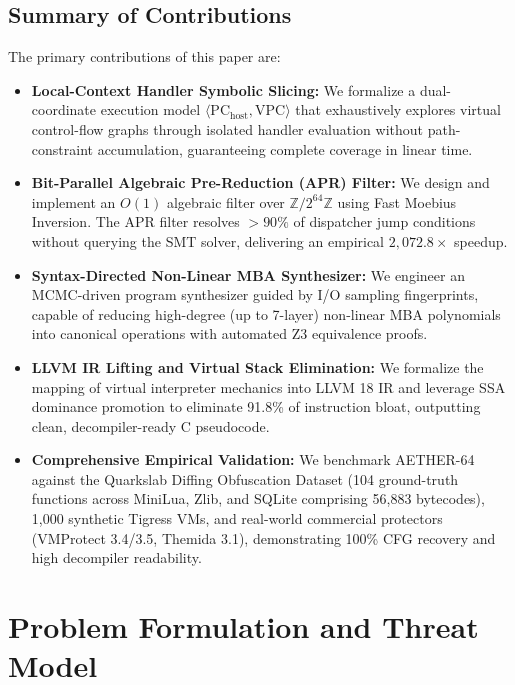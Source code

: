 \documentclass[11pt,a4paper]{article}
\begin{document}
\subsection{Summary of Contributions}
The primary contributions of this paper are:
\begin{itemize}
    \item \textbf{Local-Context Handler Symbolic Slicing:} We formalize a dual-coordinate execution model $\langle \text{PC}_{\text{host}}, \text{VPC} \rangle$ that exhaustively explores virtual control-flow graphs through isolated handler evaluation without path-constraint accumulation, guaranteeing complete coverage in linear time.
    \item \textbf{Bit-Parallel Algebraic Pre-Reduction (APR) Filter:} We design and implement an $O(1)$ algebraic filter over $\mathbb{Z}/2^{64}\mathbb{Z}$ using Fast Moebius Inversion. The APR filter resolves $>90\%$ of dispatcher jump conditions without querying the SMT solver, delivering an empirical $2,072.8\times$ speedup.
    \item \textbf{Syntax-Directed Non-Linear MBA Synthesizer:} We engineer an MCMC-driven program synthesizer guided by I/O sampling fingerprints, capable of reducing high-degree (up to 7-layer) non-linear MBA polynomials into canonical operations with automated Z3 equivalence proofs.
    \item \textbf{LLVM IR Lifting and Virtual Stack Elimination:} We formalize the mapping of virtual interpreter mechanics into LLVM 18 IR and leverage SSA dominance promotion to eliminate 91.8\% of instruction bloat, outputting clean, decompiler-ready C pseudocode.
    \item \textbf{Comprehensive Empirical Validation:} We benchmark AETHER-64 against the Quarkslab Diffing Obfuscation Dataset \cite{diffing2024} (104 ground-truth functions across MiniLua, Zlib, and SQLite comprising 56,883 bytecodes), 1,000 synthetic Tigress VMs, and real-world commercial protectors (VMProtect 3.4/3.5, Themida 3.1), demonstrating 100\% CFG recovery and high decompiler readability.
\end{itemize}

\section{Problem Formulation and Threat Model}
\end{document}
